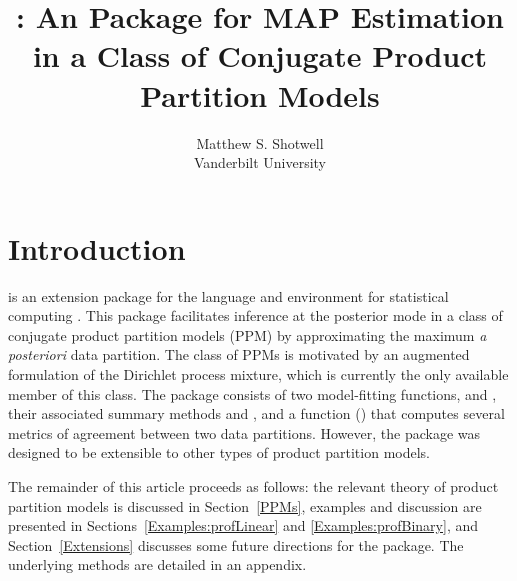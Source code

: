 \documentclass[article, nojss]{jss}
\author{Matthew S. Shotwell\\Vanderbilt University}
\title{\pkg{profdpm}: An \proglang{R} Package for MAP Estimation in a Class of Conjugate Product Partition Models}
\begin{document}
\section[Intro]{Introduction}
 is an extension package for the  language and environment for statistical computing \citep{R2011}. This package facilitates inference at the posterior mode in a class of conjugate product partition models (PPM) by approximating the maximum {\it a posteriori} data partition. The class of PPMs is motivated by an augmented formulation of the Dirichlet process mixture, which is currently the only available member of this class. The  package consists of two model-fitting functions,  and , their associated summary methods  and , and a function () that computes several metrics of agreement between two data partitions. However, the  package was designed to be extensible to other types of product partition models.

The remainder of this article proceeds as follows: the relevant theory of product partition models is discussed in Section~\ref{PPMs}, examples and discussion are presented in Sections~\ref{Examples:profLinear} and \ref{Examples:profBinary}, and Section~\ref{Extensions} discusses some future directions for the  package. The underlying  methods are detailed in an appendix.\\
\end{document}
